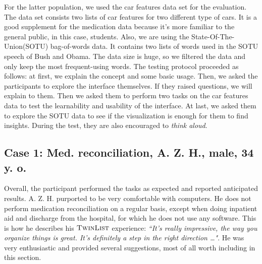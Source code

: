\documentclass{chi2009}
\newcommand{\TwinList}{\textsc{TwinList}}
\begin{document}
For the latter population, we used the car features data set for the evaluation. The data set consists two lists of car features for two different type of cars. It is a good supplement for the medication data because it's more familiar to the general public, in this case, students. Also, we are using the State-Of-The-Union(SOTU) bag-of-words data. It contains two lists of words used in the SOTU speech of Bush and Obama. The data size is huge, so we filtered the data and only keep the most frequent-using words. The testing protocol proceeded as follows: at first, we explain the concept and some basic usage. Then, we asked the participants to explore the interface themselves. If they raised questions, we will explain to them. Then we asked them to perform two tasks on the car features data to test the learnability and usability of the interface. At last, we asked them to explore the SOTU data to see if the visualization is enough for them to find insights. During the test, they are also encouraged to \textit{think aloud}.

\subsection{Case 1: Med. reconciliation, A. Z. H., male, 34 y. o.}
Overall, the participant performed the tasks as expected and reported anticipated results. A. Z. H. purported to be very comfortable with computers. He does not perform medication reconciliation on a regular basis, except when doing inpatient aid and discharge from the hospital, for which he does not use any software. This is how he describes his $\TwinList$ experience: \textit{``It's really impressive, the way you organize things is great. It's definitely a step in the right direction \dots"}. He was very enthusiastic and provided several suggestions, most of all worth including in this section. 
\end{document}
